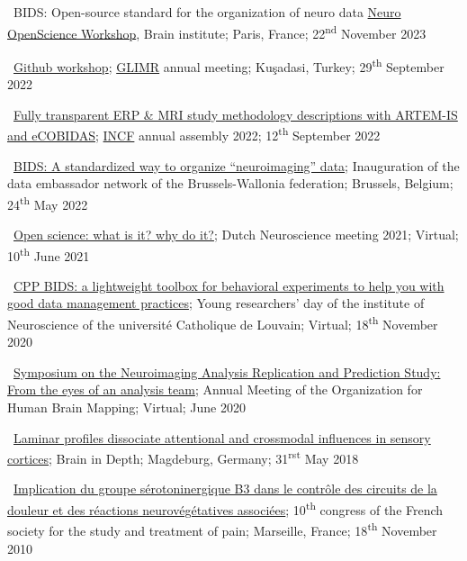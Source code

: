 \textbullet~BIDS: Open-source standard for the organization of neuro data
\href{https://open-neuro.org/}{Neuro OpenScience Workshop}, Brain institute;
Paris, France;
22\textsuperscript{nd} November 2023

\textbullet~\href{https://docs.google.com/presentation/d/1508GI_iLxyRwzJtWmnSQuSnfuGEUCaVXHguu8FRA4dI/}{Github workshop};
\href{https://glimr.eu/}{GLIMR} annual meeting;
Kuşadasi, Turkey;
29\textsuperscript{th} September 2022

\textbullet~\href{https://docs.google.com/presentation/d/1z1aixJTiUl6plDOPEIobntSKUgspVaN6Doby5EDMubI/}
{Fully transparent ERP & MRI study methodology descriptions with ARTEM-IS and eCOBIDAS};
\href{https://www.incf.org}{INCF} annual assembly 2022;
12\textsuperscript{th} September 2022

\textbullet~\href{https://osf.io/h7gcm}{BIDS: A standardized way to organize “neuroimaging” data};
Inauguration of the data embassador network of the Brussels-Wallonia federation;
Brussels, Belgium;
24\textsuperscript{th} May 2022

\textbullet~\href{https://osf.io/ce7tn/}{Open science: what is it? why do it?};
Dutch Neuroscience meeting 2021;
Virtual;
10\textsuperscript{th} June 2021

\textbullet~\href{https://osf.io/y7cjn/}{CPP BIDS: a lightweight toolbox for behavioral experiments to help you with good data management practices};
Young researchers' day of the institute of Neuroscience of the université Catholique de Louvain;
Virtual;
18\textsuperscript{th} November 2020

\textbullet~\href{https://osf.io/b8p9e/}{Symposium on the Neuroimaging Analysis
Replication and Prediction Study: From the eyes of an analysis team};
Annual Meeting of the Organization for Human Brain Mapping;
Virtual;
June 2020

\textbullet~\href{https://osf.io/b8p9e/}{Laminar profiles dissociate attentional and crossmodal influences in sensory cortices};
Brain in Depth;
Magdeburg, Germany;
31\textsuperscript{rst} May 2018

\textbullet~\href{https://osf.io/r7gfm/}{Implication du groupe sérotoninergique B3 dans le contrôle des circuits de la douleur et des réactions neurovégétatives associées};
10\textsuperscript{th} congress of the French society for the study and treatment of pain;
Marseille, France;
18\textsuperscript{th} November 2010
